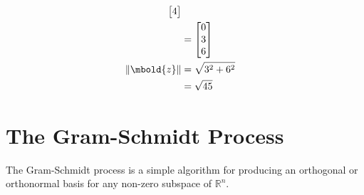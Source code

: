 \documentclass[12pt letter]{report}
\begin{document}
{\begin{align*}
\begin{bmatrix}
                                                                         4
                                                                       \end{bmatrix}                                                         \\
                    & = \begin{bmatrix}
                          0 \\
                          3 \\
                          6
                        \end{bmatrix}                                                                                                        \\
    \|\mbold{z}\|   & = \sqrt{3^2 + 6^2}                                                                                                      \\
                    & = \sqrt{45}                                                                                                             \\
  \end{align*}
}

\chapter{The Gram-Schmidt Process}

The Gram-Schmidt process is a simple algorithm for producing an orthogonal or orthonormal basis for any non-zero
subspace of $\mathbb{R}^{n}$.
\end{document}
